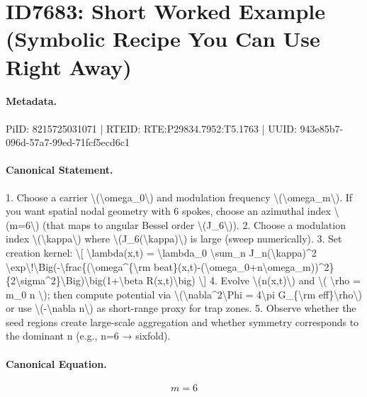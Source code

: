 \section*{ID7683: Short Worked Example (Symbolic Recipe You Can Use Right Away)}
\paragraph{Metadata.}
PiID: 8215725031071 | RTEID: RTE:P29834.7952:T5.1763 | UUID: 943e85b7-096d-57a7-99ed-71fcf5ecd6c1

\paragraph{Canonical Statement.}
1. Choose a carrier \textbackslash{}(\textbackslash{}omega\_0\textbackslash{}) and modulation frequency \textbackslash{}(\textbackslash{}omega\_m\textbackslash{}). If you want spatial nodal geometry with 6 spokes, choose an azimuthal index \textbackslash{}(m=6\textbackslash{}) (that maps to angular Bessel order \textbackslash{}(J\_6\textbackslash{})). 2. Choose a modulation index \textbackslash{}(\textbackslash{}kappa\textbackslash{}) where \textbackslash{}(J\_6(\textbackslash{}kappa)\textbackslash{}) is large (sweep numerically). 3. Set creation kernel: \textbackslash{}[ \textbackslash{}lambda(x,t) = \textbackslash{}lambda\_0 \textbackslash{}sum\_n J\_n(\textbackslash{}kappa)\textasciicircum{}2 \textbackslash{}exp\textbackslash{}!\textbackslash{}Big(-\textbackslash{}frac\{(\textbackslash{}omega\textasciicircum{}\{\textbackslash{}rm beat\}(x,t)-(\textbackslash{}omega\_0+n\textbackslash{}omega\_m))\textasciicircum{}2\}\{2\textbackslash{}sigma\textasciicircum{}2\}\textbackslash{}Big)\textbackslash{}big(1+\textbackslash{}beta R(x,t)\textbackslash{}big) \textbackslash{}] 4. Evolve \textbackslash{}(n(x,t)\textbackslash{}) and \textbackslash{}( \textbackslash{}rho = m\_0 n \textbackslash{}); then compute potential via \textbackslash{}(\textbackslash{}nabla\textasciicircum{}2\textbackslash{}Phi = 4\textbackslash{}pi G\_\{\textbackslash{}rm eff\}\textbackslash{}rho\textbackslash{}) or use \textbackslash{}(-\textbackslash{}nabla n\textbackslash{}) as short-range proxy for trap zones. 5. Observe whether the seed regions create large-scale aggregation and whether symmetry corresponds to the dominant n (e.g., n=6 → sixfold).

\paragraph{Canonical Equation.}
\[
m=6
\]

